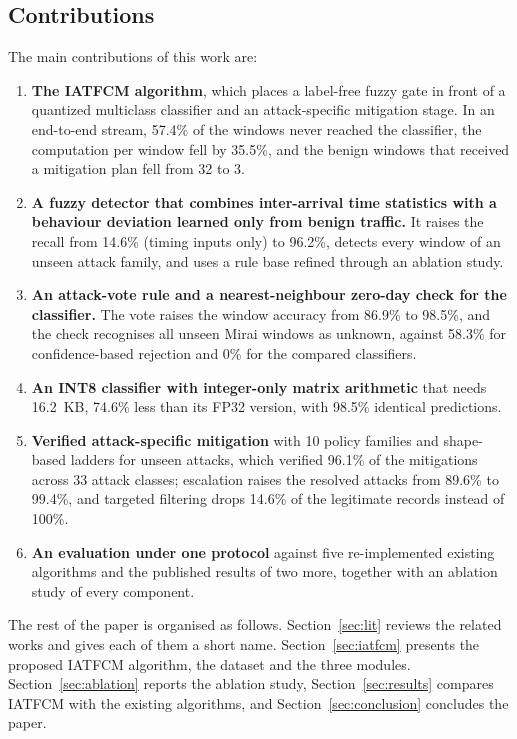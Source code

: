 \documentclass[]{interact}
\theoremstyle{plain}
\theoremstyle{definition}
\begin{document}
\subsection{Contributions}
The main contributions of this work are:
\begin{enumerate}
\item \textbf{The IATFCM algorithm}, which places a label-free fuzzy gate in front of a quantized multiclass classifier and an attack-specific mitigation stage. In an end-to-end stream, 57.4\% of the windows never reached the classifier, the computation per window fell by 35.5\%, and the benign windows that received a mitigation plan fell from 32 to 3.
\item \textbf{A fuzzy detector that combines inter-arrival time statistics with a behaviour deviation learned only from benign traffic.} It raises the recall from 14.6\% (timing inputs only) to 96.2\%, detects every window of an unseen attack family, and uses a rule base refined through an ablation study.
\item \textbf{An attack-vote rule and a nearest-neighbour zero-day check for the classifier.} The vote raises the window accuracy from 86.9\% to 98.5\%, and the check recognises all unseen Mirai windows as unknown, against 58.3\% for confidence-based rejection and 0\% for the compared classifiers.
\item \textbf{An INT8 classifier with integer-only matrix arithmetic} that needs 16.2~KB, 74.6\% less than its FP32 version, with 98.5\% identical predictions.
\item \textbf{Verified attack-specific mitigation} with 10 policy families and shape-based ladders for unseen attacks, which verified 96.1\% of the mitigations across 33 attack classes; escalation raises the resolved attacks from 89.6\% to 99.4\%, and targeted filtering drops 14.6\% of the legitimate records instead of 100\%.
\item \textbf{An evaluation under one protocol} against five re-implemented existing algorithms and the published results of two more, together with an ablation study of every component.
\end{enumerate}

The rest of the paper is organised as follows. Section~\ref{sec:lit} reviews the related works and gives each of them a short name. Section~\ref{sec:iatfcm} presents the proposed IATFCM algorithm, the dataset and the three modules. Section~\ref{sec:ablation} reports the ablation study, Section~\ref{sec:results} compares IATFCM with the existing algorithms, and Section~\ref{sec:conclusion} concludes the paper.
\end{document}
